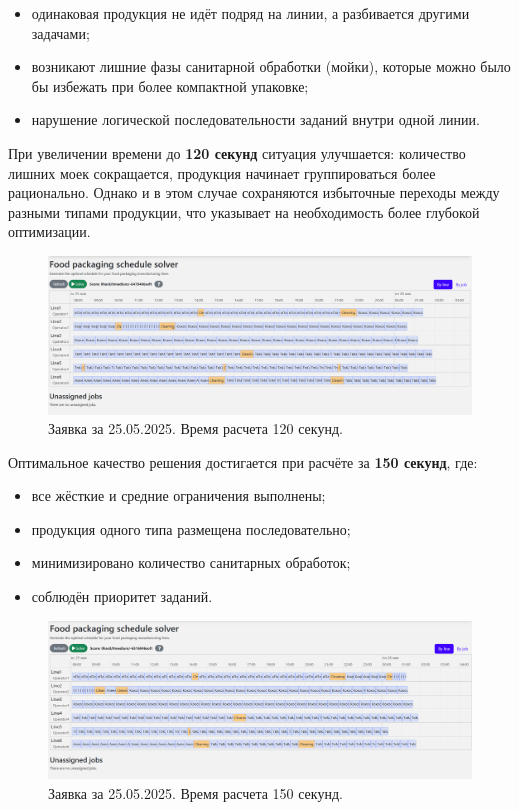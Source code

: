\begin{itemize}
\item одинаковая продукция не идёт подряд на линии, а разбивается другими задачами;
\item возникают лишние фазы санитарной обработки (мойки), которые можно было бы избежать при более компактной упаковке;
\item нарушение логической последовательности заданий внутри одной линии.
\end{itemize}

При увеличении времени до \textbf{120 секунд} ситуация улучшается: количество лишних моек сокращается, продукция начинает группироваться более рационально. Однако и в этом случае сохраняются избыточные переходы между разными типами продукции, что указывает на необходимость более глубокой оптимизации.

\begin{figure}[ht]
 \centering
        \includegraphics[height = 6 cm, keepaspectratio]{../assets/images/tests/120sec.png}
		\caption{Заявка за 25.05.2025. Время расчета 120 секунд.}
		\label{fig:quarkus_120sec}
\end{figure}

Оптимальное качество решения достигается при расчёте за \textbf{150 секунд}, где:

\begin{itemize}
\item все жёсткие и средние ограничения выполнены;
\item продукция одного типа размещена последовательно;
\item минимизировано количество санитарных обработок;
\item соблюдён приоритет заданий.
\end{itemize}

\begin{figure}[ht]
 \centering
        \includegraphics[height = 6 cm, keepaspectratio]{../assets/images/tests/150sec.png}
		\caption{Заявка за 25.05.2025. Время расчета 150 секунд.}
		\label{fig:quarkus_150sec}
\end{figure}

